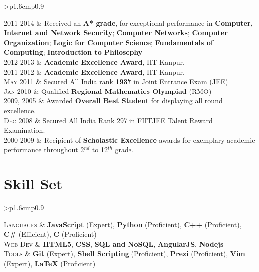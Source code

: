 \documentclass[a4paper,10pt]{article} %
\newcommand{\itemlist}[1]{
    \begin{tabular}{>{\raggedleft}p{1.6cm}p{0.9\linewidth}}
        #1
    \end{tabular}
}
\begin{document}
\itemlist {
    \textsc{2011-2014}   & Received an \textbf{A* grade}, for exceptional performance in
                            \textbf{Computer, Internet and Network Security};
                            \textbf{Computer Networks};
                            \textbf{Computer Organization};
                            \textbf{Logic for Computer Science};
                            \textbf{Fundamentals of Computing};
                            \textbf{Introduction to Philosophy} \\
    \textsc{2012-2013}   & \textbf{Academic Excellence Award}, IIT Kanpur. \\
    \textsc{2011-2012}   & \textbf{Academic Excellence Award}, IIT Kanpur. \\
    \textsc{May 2011}    & Secured All India rank \textbf{1937} in Joint Entrance Exam (JEE) \\
    \textsc{Jan 2010}    & Qualified \textbf{Regional Mathematics Olympiad} (RMO) \\
    \textsc{2009, 2005}  & Awarded \textbf{Overall Best Student} for displaying all round excellence. \\
    \textsc{Dec 2008}    & Secured All India Rank 297 in FIITJEE Talent Reward Examination. \\
    \textsc{2000-2009}   & Recipient of \textbf{Scholastic Excellence} awards for exemplary academic performance throughout
                            2$^{nd}$ to 12$^{th}$ grade. \\
}

\section{Skill Set}

\itemlist {
    \textsc{Languages} %
            & \textbf{JavaScript} (Expert), \textbf{Python} (Proficient), \textbf{C++} (Proficient),
              \textbf{C\#} (Efficient), \textbf{C} (Proficient)\\
    \textsc{Web Dev} %
            & \textbf{HTML5}, \textbf{CSS}, \textbf{SQL and NoSQL}, \textbf{AngularJS}, \textbf{Nodejs}\\
    \textsc{Tools} %
            & \textbf{Git} (Expert), \textbf{Shell Scripting} (Proficient), \textbf{Prezi} (Proficient),
              \textbf{Vim} (Expert), \textbf{LaTeX} (Proficient)\\
}
\end{document}
